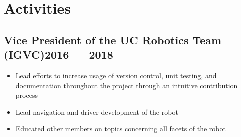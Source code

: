 \section{Activities}
\subsection{Vice President of the UC Robotics Team (IGVC)\hfill 2016 --- 2018}
\begin{itemize}
    \itemsep0em
    \item Lead efforts to increase usage of version control, unit testing, and
        documentation throughout the project through an intuitive contribution
        process
    \item Lead navigation and driver development of the robot
    \item Educated other members on topics concerning all facets of the robot
\end{itemize}
